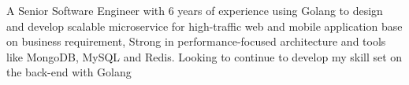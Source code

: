 


\begin{cvparagraph}


    A Senior Software Engineer with 6 years of experience using Golang to design and develop scalable microservice for high-traffic web and mobile application base on business requirement, Strong in performance-focused architecture and tools like MongoDB, MySQL and Redis. Looking to continue to develop my skill set on the back-end with Golang

\end{cvparagraph}
